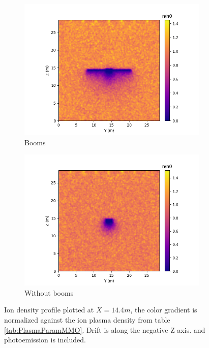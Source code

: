 \begin{figure}[H]
  \begin{subfigure}[b]{0.6\textwidth}
  \includegraphics[width=\textwidth]{figures/MMO/minZ/WB/I_minZ_WB.png}
  \caption{Booms}
  \label{fig:I_minZ_WB}
\end{subfigure}
\begin{subfigure}[b]{0.6\textwidth}
  \includegraphics[width=\textwidth]{figures/MMO/minZ/NB/I_minZ_NB.png}
  \caption{Without booms}
  \label{fig:I_minZ_NB}
\end{subfigure}
\caption{Ion density profile plotted at $X = 14.4 m$, the color gradient is normalized against the ion plasma density from table \ref{tab:PlasmaParamMMO}. Drift is along the negative Z axis. and photoemission is included.}
\label{fig:Ion_minZ}
\end{figure}

